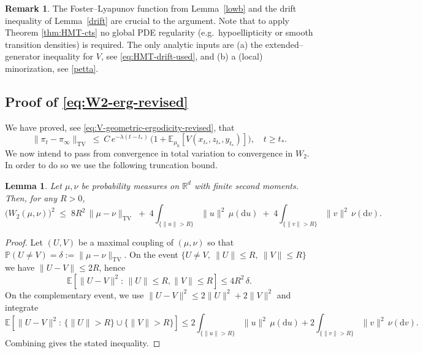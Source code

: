 \documentclass[11pt, a4paper,leqno]{amsart}
\newtheorem{lemma}{Lemma}[section]
\theoremstyle{definition}
\newtheorem{remark}{Remark}[section]
\numberwithin{equation}{section}
\newcommand{\R}{\mathbb R}
\begin{document}
\begin{remark}
The Foster–Lyapunov function from Lemma~\ref{lowb} and the drift inequality of Lemma~\ref{drift} are crucial to the argument. Note that to apply Theorem \ref{thm:HMT-cts} no global PDE regularity (e.g.\ hypoellipticity or smooth transition densities) is required. The only analytic inputs are (a) the extended–generator inequality for $V$, see \eqref{eq:HMT-drift-used}, and (b) a (local) minorization, see \eqref{petta}.
\end{remark}






\subsection{Proof of \eqref{eq:W2-erg-revised}} We have proved, see \eqref{eq:V-geometric-ergodicity-revised}, that
\begin{equation}\label{HM}
\|\pi_t-\pi_\infty\|_{\mathrm{TV}}
\ \le\ C\,e^{-\lambda (t-t_\ast)}\,\bigl(1+\mathbb E_{\mu_0}[V(x_{t_\ast},z_{t_\ast},y_{t_\ast})]\bigr),\quad t\geq t_\ast.
\end{equation}
We now intend to pass from convergence in total variation to convergence in $W_2$.  In order to do so we use the following truncation bound.


\begin{lemma}\label{kkaa} Let $\mu,\nu$ be probability measures on $\R^{d}$ with finite second moments.
Then, for any $R>0$,
\[
\bigl (W_2(\mu,\nu)\bigr )^2
\;\le\; 8R^2\,\|\mu-\nu\|_{\mathrm{TV}}
\;+\;4\!\!\int_{\{\|u\|>R\}}\!\!\|u\|^2\,\mu(\mathrm du)
\;+\;4\!\!\int_{\{\|v\|>R\}}\!\!\|v\|^2\,\nu(\mathrm dv).
\]
\end{lemma}

\begin{proof}
Let $(U,V)$ be a maximal coupling of $(\mu,\nu)$ so that
$\mathbb P(U\neq V)=\delta:=\|\mu-\nu\|_{\mathrm{TV}}$.
On the event $\{U\neq V,\ \|U\|\le R,\ \|V\|\le R\}$ we have $\|U-V\|\le 2R$, hence
\[
\mathbb E[\|U-V\|^2:\,\|U\|\le R,\|V\|\le R]\le 4R^2\,\delta.
\]
On the complementary event, we use $\|U-V\|^2\le 2\|U\|^2+2\|V\|^2$ and integrate
\[
\mathbb E[\|U-V\|^2:\,\{\|U\|>R\}\cup\{\|V\|>R\}]
\le 2\!\int_{\{\|u\|>R\}}\|u\|^2\,\mu(\mathrm du)
+2\!\int_{\{\|v\|>R\}}\|v\|^2\,\nu(\mathrm dv).
\]
Combining gives the stated inequality.
\end{proof}
\end{document}
